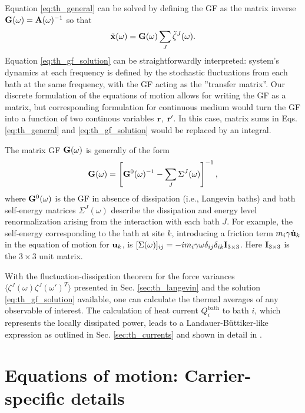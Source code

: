 Equation \eqref{eq:th_general} can be solved by defining the GF as the matrix inverse $\mathbf{G}(\omega)=\mathbf{A}(\omega)^{-1}$ so that  
\begin{equation}
 \tilde{\mathbf{x}}(\omega)  =  \mathbf{G}(\omega) \sum_J \tilde \zeta^J(\omega). \label{eq:th_gf_solution}
\end{equation}
Equation \eqref{eq:th_gf_solution} can be straightforwardly interpreted: system's dynamics at each frequency is defined by the stochastic fluctuations from each bath at the same frequency, with the GF acting as the ''transfer matrix''. Our discrete formulation of the equations of motion allows for writing the GF as a matrix, but corresponding formulation for continuous medium would turn the GF into a function of two continous variables $\mathbf{r}$, $\mathbf{r}'$. In this case, matrix sums in Eqs. \eqref{eq:th_general} and \eqref{eq:th_gf_solution} would be replaced by an integral.

The matrix GF $\mathbf{G}(\omega)$ is generally of the form \cite{datta}
\begin{equation}
 \mathbf{G}(\omega) = \left[\mathbf{G}^0(\omega)^{-1} - \sum_J \Sigma^J(\omega) \right]^{-1},
\end{equation}
where $\mathbf{G}^0(\omega)$ is the GF in absence of dissipation (i.e., Langevin baths) and bath self-energy matrices $\Sigma^J(\omega)$ describe the dissipation and energy level renormalization arising from the interaction with each bath $J$. For example, the self-energy corresponding to the bath at site $k$, introducing a friction term $m_i\gamma \dot{\mathbf{u}}_k$ in the equation of motion for $\mathbf{u}_k$, is $[\Sigma(\omega)]_{ij}=-im_i\gamma \omega \delta_{ij} \delta_{ik}\mathbf{I}_{3 \times 3}$. Here $\mathbf{I}_{3 \times 3}$ is the $3\times3$ unit matrix. 

With the fluctuation-dissipation theorem for the force variances $\langle \zeta^J(\omega) \zeta^J(\omega')^T \rangle$ presented in Sec. \ref{sec:th_langevin} and the solution \eqref{eq:th_gf_solution} available, one can calculate the thermal averages of any observable of interest. The calculation of heat current $ Q_i^{\textrm{bath}}$ to bath $i$, which represents the locally dissipated power, leads to a Landauer-B\"uttiker-like expression \cite{landauer57,buttiker92} as outlined in Sec. \ref{sec:th_currents} and shown in detail in . 

\section{Equations of motion: Carrier-specific details}
\label{sec:th_eom2}

